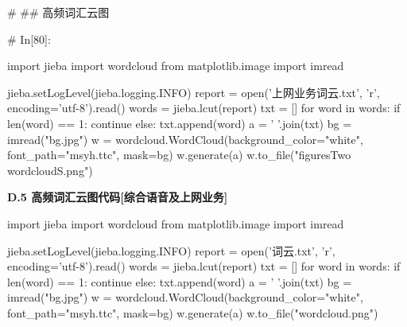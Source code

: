 \documentclass{MathorCupmodeling}
\begin{document}
\begin{python}
# ## 高频词汇云图

# In[80]:


import jieba
import wordcloud
from matplotlib.image import imread

jieba.setLogLevel(jieba.logging.INFO)
report = open('上网业务词云.txt', 'r', encoding='utf-8').read()
words = jieba.lcut(report)
txt = []
for word in words:
    if len(word) == 1:
        continue
    else:
        txt.append(word)
a = ' '.join(txt)
bg = imread("bg.jpg")
w = wordcloud.WordCloud(background_color="white", font_path="msyh.ttc", mask=bg)
w.generate(a)
w.to_file("figuresTwo\\wordcloudS.png")

\end{python}
\newpage
\textbf{D.5 高频词汇云图代码[综合语音及上网业务]}
\begin{python}
import jieba
import wordcloud
from matplotlib.image import imread

jieba.setLogLevel(jieba.logging.INFO)
report = open('词云.txt', 'r', encoding='utf-8').read()
words = jieba.lcut(report)
txt = []
for word in words:
    if len(word) == 1:
        continue
    else:
        txt.append(word)
a = ' '.join(txt)
bg = imread("bg.jpg")
w = wordcloud.WordCloud(background_color="white", font_path="msyh.ttc", mask=bg)
w.generate(a)
w.to_file("wordcloud.png")

\end{python}
\end{document}
